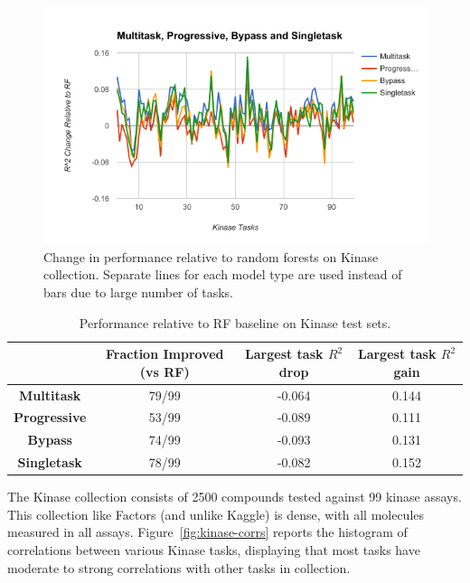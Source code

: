 \begin{figure}[H]
  \includegraphics[width=.9\textwidth]{Images/Kinase_imp.png}
  \caption{Change in performance relative to random forests on Kinase collection. Separate lines for each model type are used instead of bars due to large number of tasks.}
  \label{fig:kinase-imp}
\end{figure}

\begin{table}[h]
    \centering
    \begin{tabular}{ |c|c|c|c| } 
    \hline
     & Fraction Improved (vs RF) & Largest task $R^2$ drop & Largest task $R^2$ gain \\ 
    \hline
    \textbf{Multitask} & 79/99 & -0.064 & 0.144  \\
    \hline
    \textbf{Progressive} & 53/99 & -0.089 & 0.111  \\
    \hline
    \textbf{Bypass} & 74/99 & -0.093 & 0.131  \\
    \hline
    \textbf{Singletask} & 78/99 & -0.082 & 0.152  \\
    \hline
    \end{tabular}
    \caption{Performance relative to RF baseline on Kinase test sets.}
    \label{tab:kinase-comp}
\end{table}

The Kinase collection consists of 2500 compounds tested against 99 kinase assays. This collection like Factors (and unlike Kaggle) is dense, with all molecules measured in all assays.  Figure~\ref{fig:kinase-corrs} reports the histogram of correlations between various Kinase tasks, displaying that most tasks have moderate to strong correlations with other tasks in collection.

